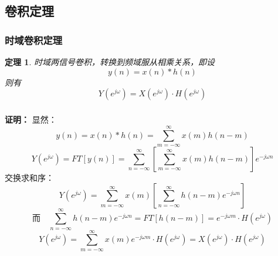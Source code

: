 \documentclass[notheorems,compress,mathserif,table]{beamer}
\newtheorem{theorem}{定理}
\begin{document}
\subsection*{卷积定理}
\begin{frame}[shrink]\frametitle{时域卷积定理}%

\begin{theorem}

时域两信号卷积，转换到频域服从相乘关系，即设$$y(n)=x(n)*h(n)$$
则有
\begin{equation*}
Y(e^{j\omega})=X(e^{j\omega})\cdot H(e^{j\omega})
\end{equation*}
\end{theorem}
\end{frame}



\begin{frame}[shrink]\frametitle{}%

\textbf{证明：}
显然：$$y(n) = x(n)*h(n) = \sum_{m=-\infty}^{\infty}x(m)h(n-m)$$
$$Y(e^{j\omega})= FT[y(n)] = \sum_{n=-\infty}^{\infty}\left[\sum_{m=-\infty}^{\infty}x(m)h(n-m)\right]
e^{-j\omega n}$$
\quad\quad 交换求和序：
$$Y(e^{j\omega})= \sum_{m=-\infty}^{\infty}x(m)\left[\sum_{n=-\infty}^{\infty}h(n-m)e^{-j\omega n}\right]$$
$$\mbox{而}\quad \sum_{n=-\infty}^{\infty}h(n-m)e^{-j\omega n} = FT[h(n-m)]
= e^{-j\omega m}\cdot H(e^{j\omega})$$
$$Y(e^{j\omega})= \sum_{m=-\infty}^{\infty}x(m)e^{-j\omega m}\cdot H(e^{j\omega})
= X(e^{j\omega})\cdot H(e^{j\omega})$$
\end{frame}
\end{document}
